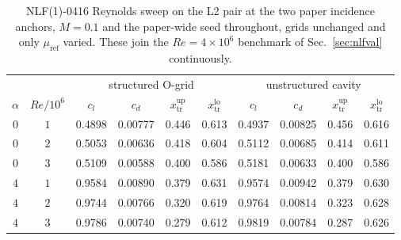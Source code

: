 \begin{table}[tp]
  \centering\small
  \caption{NLF(1)-0416 Reynolds sweep on the L2 pair at the two paper incidence anchors, $M\!=\!0.1$ and the paper-wide seed throughout, grids unchanged and only $\mu_\mathrm{ref}$ varied. These join the $Re\!=\!4\!\times\!10^6$ benchmark of Sec.~\ref{sec:nlfval} continuously.}
  \label{tab:extnlfresweep}
  \begin{tabular}{cc cccc cccc}
    \toprule
    & & \multicolumn{4}{c}{structured O-grid} & \multicolumn{4}{c}{unstructured cavity} \\
    \cmidrule(lr){3-6}\cmidrule(lr){7-10}
    $\alpha$ & $Re/10^6$ & $c_l$ & $c_d$ & $x_\mathrm{tr}^\mathrm{up}$ & $x_\mathrm{tr}^\mathrm{lo}$
             & $c_l$ & $c_d$ & $x_\mathrm{tr}^\mathrm{up}$ & $x_\mathrm{tr}^\mathrm{lo}$ \\
    \midrule
    $0$ & $1$ & 0.4898 & 0.00777 & 0.446 & 0.613 & 0.4937 & 0.00825 & 0.456 & 0.616 \\
    $0$ & $2$ & 0.5053 & 0.00636 & 0.418 & 0.604 & 0.5112 & 0.00685 & 0.414 & 0.611 \\
    $0$ & $3$ & 0.5109 & 0.00588 & 0.400 & 0.586 & 0.5181 & 0.00633 & 0.400 & 0.586 \\
    $4$ & $1$ & 0.9584 & 0.00890 & 0.379 & 0.631 & 0.9574 & 0.00942 & 0.379 & 0.630 \\
    $4$ & $2$ & 0.9744 & 0.00766 & 0.320 & 0.619 & 0.9764 & 0.00814 & 0.323 & 0.628 \\
    $4$ & $3$ & 0.9786 & 0.00740 & 0.279 & 0.612 & 0.9819 & 0.00784 & 0.287 & 0.626 \\
    \bottomrule
  \end{tabular}
\end{table}
